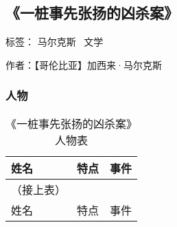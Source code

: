 \subsection{《一桩事先张扬的凶杀案》}

标签： 马尔克斯 \ 文学

作者：【哥伦比亚】加西来·马尔克斯

\subsubsection{人物}

\begin{longtable}{p{} | p{} | p{}}

    \caption{《一桩事先张扬的凶杀案》人物表} \\
    \hline
姓名 & 特点 & 事件 \\
\hline
\endfirsthead

（接上表） \\
姓名 & 特点 & 事件 \\
\hline
\endhead


\end{longtable}
